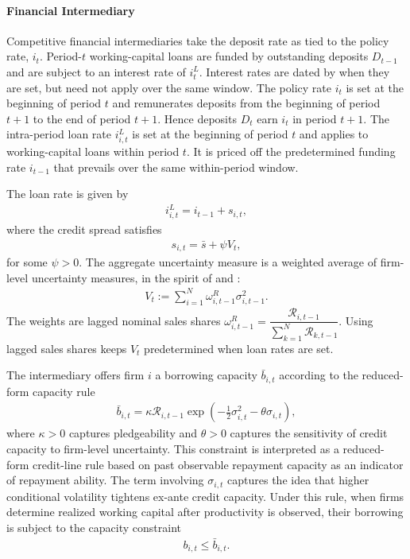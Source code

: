 \documentclass[12pt]{article}
\numberwithin{equation}{section}
\begin{document}
\noindent \paragraph{Financial Intermediary} Competitive financial intermediaries take the deposit rate as tied to the policy rate, $i_t$. Period-$t$ working-capital loans are funded by outstanding deposits $D_{t-1}$ and are subject to an interest rate of $i^L_t$. Interest rates are dated by when they are set, but need not apply over the same window. The policy rate $i_t$ is set at the beginning of period $t$ and remunerates deposits from the beginning of period $t+1$ to the end of period $t+1$. Hence deposits $D_t$ earn $i_t$ in period $t+1$. The intra-period loan rate $i^L_{i,t}$ is set at the beginning of period $t$ and applies to working-capital loans within period $t$. It is priced off the predetermined funding rate $i_{t-1}$ that prevails over the same within-period window. 

The loan rate is given by
\begin{align}\label{eq:loan_rate_rule}
    i^L_{i,t}
    =
    i_{t-1}
    +
    s_{i,t},
\end{align}
where the credit spread satisfies
\begin{align}\label{eq:credit_spread_rule}
    s_{i,t}
    =
    \bar s
    +
    \psi V_t,
\end{align}
for some $\psi>0$. The aggregate uncertainty measure is a weighted average of firm-level uncertainty measures, in the spirit of \citep{juradoMeasuringUncertainty2015} and \citep{ludvigsonUncertaintyBusinessCycles2021}:
\begin{align}\label{eq:aggregate_uncertainty}
    V_t
    :=
    \sum_{i=1}^N \omega^R_{i,t-1}\sigma^2_{i,t-1}.
\end{align}
The weights are lagged nominal sales shares $\omega^R_{i,t-1} = \dfrac{\mathcal R_{i,t-1}}{\sum_{k=1}^N\mathcal R_{k,t-1}}$.
Using lagged sales shares keeps $V_t$ predetermined when loan rates are set.

The intermediary offers firm $i$ a borrowing capacity $\bar b_{i,t}$ according to the reduced-form capacity rule
\begin{align}\label{eq:borrowing_capacity_rule}
    \bar b_{i,t}
    =
    \kappa \mathcal R_{i,t-1}
    \exp\left(
    -\frac12\sigma^2_{i,t}
    -
    \theta\sigma_{i,t}
    \right),
\end{align}
where $\kappa>0$ captures pledgeability and $\theta>0$ captures the sensitivity of credit capacity to firm-level uncertainty. This constraint is interpreted as a reduced-form credit-line rule based on past observable repayment capacity as an indicator of repayment ability. The term involving $\sigma_{i,t}$ captures the idea that higher conditional volatility tightens ex-ante credit capacity. Under this rule, when firms determine realized working capital after productivity is observed, their borrowing is subject to the capacity constraint
\begin{align}\label{eq:borrowing_constraint}
    b_{i,t} \leq \bar b_{i,t}.
\end{align}
\end{document}
